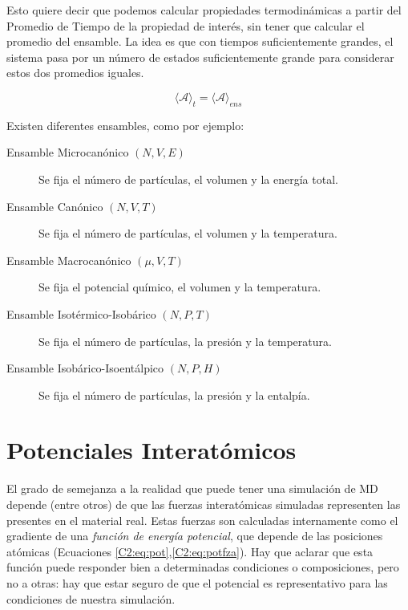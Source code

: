 Esto quiere decir que podemos calcular propiedades termodinámicas a partir del Promedio de Tiempo de la propiedad de interés, sin tener que calcular el promedio del ensamble. La idea es que con tiempos suficientemente grandes, el sistema pasa por un número de estados suficientemente grande para considerar estos dos promedios iguales.

\begin{equation}
\langle \mathbf{\mathcal{A}} \rangle _{t} = \langle \mathbf{\mathcal{A}} \rangle _{ens}
\end{equation}

Existen diferentes ensambles, como por ejemplo:

\begin{description}
	\item[Ensamble Microcanónico $(N,V,E)$] Se fija el número de partículas, el volumen y la energía total.
	\item[Ensamble Canónico $(N,V,T)$] Se fija el número de partículas, el volumen y la temperatura.
	\item[Ensamble Macrocanónico $(\mu,V,T)$] Se fija el potencial químico, el volumen y la temperatura.
	\item[Ensamble Isotérmico-Isobárico $(N,P,T)$] Se fija el número de partículas, la presión y la temperatura.
	\item[Ensamble Isobárico-Isoentálpico $(N,P,H)$] Se fija el número de partículas, la presión y la entalpía.
\end{description}

\section{Potenciales Interatómicos}
\label{S2_3}

El grado de semejanza a la realidad que puede tener una simulación de MD depende (entre otros) de que las fuerzas interatómicas simuladas representen las presentes en el material real. Estas fuerzas son calculadas internamente como el gradiente de una \textit{función de energía potencial}, que depende de las posiciones atómicas (Ecuaciones \ref{C2:eq:pot},\ref{C2:eq:potfza}). Hay que aclarar que esta función puede responder bien a determinadas condiciones o composiciones, pero no a otras: hay que estar seguro de que el potencial es representativo para las condiciones de nuestra simulación.

